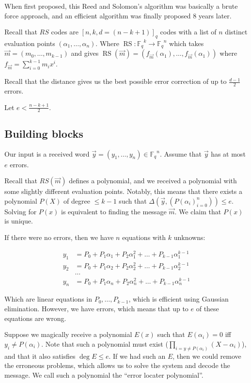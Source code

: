 \documentclass{idc_msc}
\newcommand{\Fq}[1][q]{{\mathbb{F}_{#1}}}
\DeclareMathOperator*{\RS}{RS}
\begin{document}
When first proposed, this Reed and Solomon's algorithm was basically a brute force approach, and an efficient algorithm was finally proposed 8 years later.

Recall that \(RS\) codes are \([n,k,d=(n-k+1)]_q\) codes with a list of \(n\) distinct evaluation points \((\alpha_1,\ldots,\alpha_n)\).
Where \(\RS : \Fq^k \to \Fq^n\) which takes \(\vec{m} = (m_0,\ldots,m_{k-1})\) and gives \(\RS(\vec{m}) = (f_{\vec{m}}(\alpha_1), \ldots, f_{\vec{m}}(\alpha_1))\) where \(f_{\vec{m}}=\sum_{i=0}^{k-1} m_i x^i\).

Recall that the distance gives us the best possible error correction of up to \(\frac{d-1}{2}\) errors.

Let \(e < \frac{n - k + 1}{2}\).

\subsection{Building blocks}


Our input is a received word \(\vec{y} = (y_1,\ldots,y_n) \in \Fq^n\).
Assume that \(\vec{y}\) has at most \(e\) errors.

Recall that \(RS(\vec{m})\) defines a polynomial, and we received a polynomial with some slightly different evaluation points.
Notably, this means that there exists a polynomial \(P(X)\) of degree \(\le k-1\) such that \(\Delta(\vec{y}, (P(\alpha_i)_{i=0}^n))\le e\).
Solving for \(P(x)\) is equivalent to finding the message \(\vec{m}\).
We claim that \(P(x)\) is unique.

If there were no errors, then we have \(n\) equations with \(k\) unknowns:

\[
\begin{aligned}
y_1 &= P_0 + P_1 \alpha_1 + P_2 \alpha_1^2+\ldots+P_{k-1} \alpha_1^{k-1} \\
y_2 &= P_0 + P_1 \alpha_2 + P_2 \alpha_2^2+\ldots+P_{k-1} \alpha_2^{k-1} \\
&\ldots \\
y_n &= P_0 + P_1 \alpha_n + P_2 \alpha_n^2+\ldots+P_{k-1} \alpha_n^{k-1}
\end{aligned}
\]

Which are linear equations in \(P_0,\ldots,P_{k-1}\), which is efficient using Gaussian elimination.
However, we have errors, which means that up to \(e\) of these equations are wrong.

Suppose we magically receive a polynomial \(E(x)\) such that \(E(\alpha_i) = 0\) iff \(y_i \ne P(\alpha_i)\).
Note that such a polynomial must exist (\(\prod_{i = y \ne P(\alpha_i)}(X-\alpha_i)\)), and that it also satisfies \(\deg E \le e\).
If we had such an \(E\), then we could remove the erroneous problems, which allows us to solve the system and decode the message.
We call such a polynomial the ``error locater polynomial''.
\end{document}
